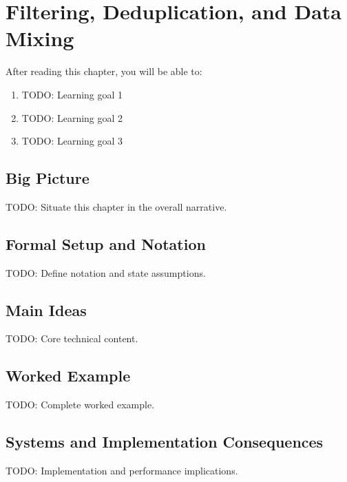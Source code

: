 \chapter{Filtering, Deduplication, and Data Mixing}
\label{ch:23}

\begin{keyinsight}
After reading this chapter, you will be able to:
\begin{enumerate}
  \item TODO: Learning goal 1
  \item TODO: Learning goal 2
  \item TODO: Learning goal 3
\end{enumerate}
\end{keyinsight}

\section{Big Picture}
\label{ch:23:sec:big_picture}

TODO: Situate this chapter in the overall narrative.

\section{Formal Setup and Notation}
\label{ch:23:sec:setup}

TODO: Define notation and state assumptions.

\section{Main Ideas}
\label{ch:23:sec:main}

TODO: Core technical content.

\section{Worked Example}
\label{ch:23:sec:example}

TODO: Complete worked example.

\section{Systems and Implementation Consequences}
\label{ch:23:sec:systems}

TODO: Implementation and performance implications.

